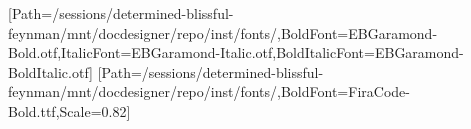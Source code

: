 \usepackage{fontspec}
\usepackage{anyfontsize}
\setmainfont{EBGaramond-Regular.otf}[Path=/sessions/determined-blissful-feynman/mnt/docdesigner/repo/inst/fonts/,BoldFont=EBGaramond-Bold.otf,ItalicFont=EBGaramond-Italic.otf,BoldItalicFont=EBGaramond-BoldItalic.otf]
\setmonofont{FiraCode-Regular.ttf}[Path=/sessions/determined-blissful-feynman/mnt/docdesigner/repo/inst/fonts/,BoldFont=FiraCode-Bold.ttf,Scale=0.82]
\usepackage{xcolor}
\color{text}
\usepackage[explicit]{titlesec}
\titlespacing*{\section}{0pt}{1.7em}{0.5em}
\titlespacing*{\subsection}{0pt}{1.1em}{0.3em}
\titlespacing*{\subsubsection}{0pt}{0.9em}{0.2em}
\usepackage{titling}
\pretitle{\begin{flushleft}\fontsize{28.6}{31.5}\selectfont\bfseries\color{accent}}
\posttitle{\par\end{flushleft}\vskip0.3em{\color{rule}\rule{\linewidth}{2pt}}\vskip0.4em}
\preauthor{\begin{flushleft}\large\color{muted}}
\postauthor{\end{flushleft}}
\predate{\begin{flushleft}\color{muted}}
\postdate{\end{flushleft}}
\usepackage{microtype}
\usepackage{booktabs}
\renewcommand{\arraystretch}{1.2}
\setlength{\parindent}{0pt}
\setlength{\parskip}{0.5em}
\linespread{1.3}
\usepackage{fancyhdr}\pagestyle{fancy}\fancyhf{}
\renewcommand{\headrulewidth}{0pt}\renewcommand{\footrulewidth}{0.4pt}
\fancyfoot[R]{\small\color{muted}\thepage}